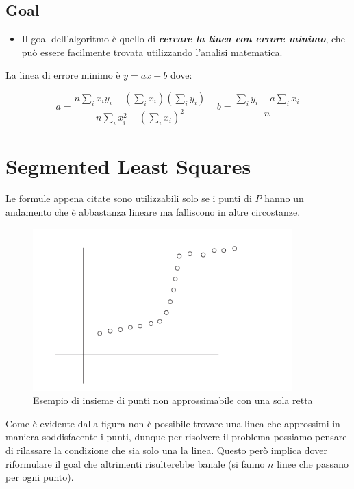 \subsection{Goal}

\begin{itemize}
  \item
        Il goal dell'algoritmo è quello di \textbf{\emph{cercare la linea con
            errore minimo}}, che può essere facilmente trovata utilizzando
        l'analisi matematica.
\end{itemize}



La linea di errore minimo è $y = ax + b$ dove:

$$
  a = \frac{n \sum_{i} x_i y_i - (\sum_{i} x_i) (\sum_{i} y_i)}{n \sum_{i} x_i^2 - (\sum_{i} x_i)^2} \ \ \  \ \ b = \frac{\sum_{i} y_i - a \sum_{i} x_i}{n}
$$

\section{Segmented Least Squares}

Le formule appena citate sono utilizzabili solo se i punti di $P$
hanno un andamento che è abbastanza lineare ma falliscono in altre
circostanze.

\begin{figure}[H]
\centering
  \includegraphics[width = 10cm, keepaspectratio]{Programmazione_dinamica/imgs/seg_llsqr.png}
  \caption{Esempio di insieme di punti non approssimabile con una sola retta}
\end{figure}

Come è evidente dalla figura non è possibile trovare una linea che
approssimi in maniera soddisfacente i punti, dunque per risolvere il
problema possiamo pensare di rilassare la condizione che sia solo una la
linea. Questo però implica dover riformulare il goal che altrimenti
risulterebbe banale (si fanno $n$ linee che passano per ogni punto).

